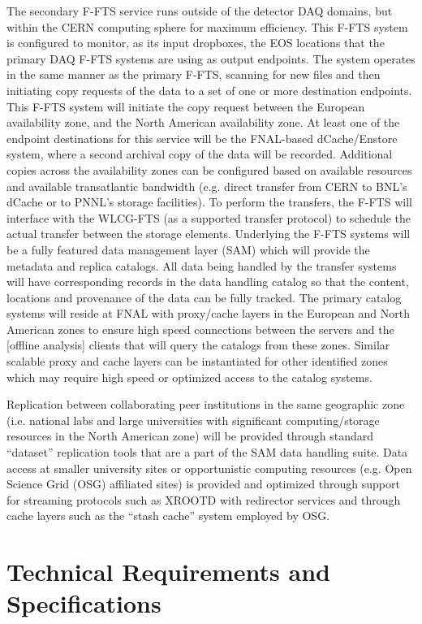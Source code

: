 \documentclass[pdftex,12pt,letter]{article}
\begin{document}
The secondary F-FTS service runs outside of the detector DAQ domains, but within the CERN computing sphere for maximum efficiency.  This F-FTS system is configured to monitor, as its input dropboxes, the EOS locations that the primary DAQ F-FTS systems are using as output endpoints.  The system operates in the same manner as the primary F-FTS, scanning for new files and then initiating copy requests of the data to a set of one or more destination endpoints.  This F-FTS system will initiate the copy request between the European availability zone, and the North American availability zone.  At least one of the endpoint destinations for this service will be the FNAL-based dCache/Enstore system, where a second archival copy of the data will be recorded.  Additional copies across the availability zones can be configured based on available resources and available transatlantic bandwidth (e.g. direct transfer from CERN to BNL’s dCache or to PNNL’s storage facilities).  To perform the transfers, the F-FTS will interface with the WLCG-FTS (as a supported transfer protocol) to schedule the actual transfer between the storage elements.  
Underlying the F-FTS systems will be a fully featured data management layer (SAM) which will provide the metadata and replica catalogs.  All data being handled by the transfer systems will have corresponding records in the data handling catalog so that the content, locations and provenance of the data can be fully tracked.  The primary catalog systems will reside at FNAL with proxy/cache layers in the European and North American zones to ensure high speed connections between the servers and the [offline analysis] clients that will query the catalogs from these zones.  Similar scalable proxy and cache layers can be instantiated for other identified zones which may require high speed or optimized access to the catalog systems.
 
Replication between collaborating peer institutions in the same geographic zone  (i.e. national labs and large universities with significant computing/storage resources in the North American zone) will be provided through standard “dataset” replication tools that are a part of the SAM data handling suite.  Data access at smaller university sites or opportunistic computing resources (e.g. Open Science Grid (OSG) affiliated sites) is provided and optimized through support for streaming protocols such as XROOTD with redirector services and through cache layers such as the “stash cache” system employed by OSG.  

\section{Technical Requirements and Specifications}
\end{document}
